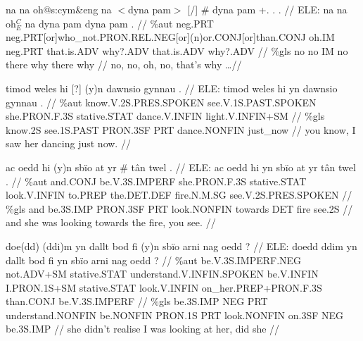 \documentclass[a4paper,10pt]{article}
\begin{document}
\ex
\begingl[lingstyle=gergl]
\glchat na na oh@s:cym\&eng na $<$dyna pam$>$ [/] \# dyna pam +. . . //
\glsurface ELE:  na na oh$^{C}_{E}$ na dyna pam dyna pam .  //
\glauto \%aut  neg{\scriptsize .PRT} neg{\scriptsize .PRT[or]who\_not.PRON.REL.NEG[or](n)or.CONJ[or]than.CONJ} oh{\scriptsize .IM} neg{\scriptsize .PRT} that{\scriptsize .is.ADV} why?.ADV that{\scriptsize .is.ADV} why?.ADV   //
\glmanual \%gls  no no IM no there why there why   //
\gleng no, no, oh, no, that's why \dots  //
\endgl
\xe

\ex
\begingl[lingstyle=gergl]
\glchat timod weles hi [?] (y)n dawnsio gynnau . //
\glsurface ELE:  timod weles hi yn dawnsio gynnau .  //
\glauto \%aut  know{\scriptsize .V.2S.PRES.SPOKEN} see{\scriptsize .V.1S.PAST.SPOKEN} she{\scriptsize .PRON.F.3S} stative{\scriptsize .STAT} dance{\scriptsize .V.INFIN} light{\scriptsize .V.INFIN+SM}   //
\glmanual \%gls  know{\scriptsize .2S} see{\scriptsize .1S.PAST} PRON{\scriptsize .3SF} PRT dance{\scriptsize .NONFIN} just\_now   //
\gleng you know, I saw her dancing just now. //
\endgl
\xe

\ex
\begingl[lingstyle=gergl]
\glchat ac oedd hi (y)n sbïo at yr \# tân twel . //
\glsurface ELE:  ac oedd hi yn sbïo at yr tân twel .  //
\glauto \%aut  and{\scriptsize .CONJ} be{\scriptsize .V.3S.IMPERF} she{\scriptsize .PRON.F.3S} stative{\scriptsize .STAT} look{\scriptsize .V.INFIN} to{\scriptsize .PREP} the{\scriptsize .DET.DEF} fire{\scriptsize .N.M.SG} see{\scriptsize .V.2S.PRES.SPOKEN}   //
\glmanual \%gls  and be{\scriptsize .3S.IMP} PRON{\scriptsize .3SF} PRT look{\scriptsize .NONFIN} towards DET fire see{\scriptsize .2S}   //
\gleng and she was looking towards the fire, you see. //
\endgl
\xe

\ex
\begingl[lingstyle=gergl]
\glchat doe(dd) (ddi)m yn dallt bod fi (y)n sbïo arni nag oedd ? //
\glsurface ELE:  doedd ddim yn dallt bod fi yn sbïo arni nag oedd ?  //
\glauto \%aut  be{\scriptsize .V.3S.IMPERF.NEG} not{\scriptsize .ADV+SM} stative{\scriptsize .STAT} understand{\scriptsize .V.INFIN.SPOKEN} be{\scriptsize .V.INFIN} I{\scriptsize .PRON.1S+SM} stative{\scriptsize .STAT} look{\scriptsize .V.INFIN} on\_her{\scriptsize .PREP+PRON.F.3S} than{\scriptsize .CONJ} be{\scriptsize .V.3S.IMPERF}   //
\glmanual \%gls  be{\scriptsize .3S.IMP} NEG PRT understand{\scriptsize .NONFIN} be{\scriptsize .NONFIN} PRON{\scriptsize .1S} PRT look{\scriptsize .NONFIN} on{\scriptsize .3SF} NEG be{\scriptsize .3S.IMP}   //
\gleng she didn't realise I was looking at her, did she //
\endgl
\xe
\end{document}
